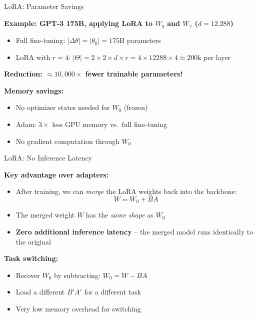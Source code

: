 \documentclass[11pt,compress,t,notes=noshow, xcolor=table]{beamer}
\begin{document}
\begin{frame}{LoRA: Parameter Savings}

\vfill

\textbf{Example: GPT-3 175B, applying LoRA to $W_q$ and $W_v$ ($d = 12.288$)}

\begin{itemize}
  \item Full fine-tuning: $|\Delta\theta| = |\theta_0| = 175$B parameters
  \item LoRA with $r = 4$: $|\Theta| = 2 \times 2 \times d \times r = 4 \times 12288 \times 4 \approx 200\text{k}$ per layer
\end{itemize}

\vfill

\textbf{Reduction: $\approx 10{,}000\times$ fewer trainable parameters!}

\vfill

\textbf{Memory savings:}
\begin{itemize}
  \item No optimizer states needed for $W_0$ (frozen)
  \item Adam: $3\times$ less GPU memory vs.\ full fine-tuning
  \item No gradient computation through $W_0$
\end{itemize}

\vfill

\end{frame}


\begin{frame}{LoRA: No Inference Latency}

\vfill

\textbf{Key advantage over adapters:}

\begin{itemize}
  \item After training, we can \textit{merge} the LoRA weights back into the backbone:
  $$W = W_0 + BA$$
  \item The merged weight $W$ has the \textit{same shape} as $W_0$
  \item \textbf{Zero additional inference latency} -- the merged model runs identically to the original
\end{itemize}

\vfill

\textbf{Task switching:}
\begin{itemize}
  \item Recover $W_0$ by subtracting: $W_0 = W - BA$
  \item Load a different $B'A'$ for a different task
  \item Very low memory overhead for switching
\end{itemize}

\vfill

\end{frame}
\end{document}
